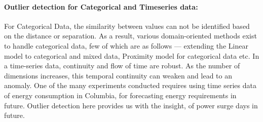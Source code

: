 \documentclass[runningheads]{llncs}
\begin{document}
\paragraph*{Outlier detection for Categorical and Timeseries data:} For Categorical Data, the similarity between values can not be identified based on the distance or separation. As a result, various domain-oriented methods exist to handle categorical data, few of which are as follows — extending the Linear model to categorical and mixed data, Proximity model for categorical data etc. In a time-series data, continuity and flow of time are robust. As the number of dimensions increases, this temporal continuity can weaken and lead to an anomaly. One of the many experiments conducted requires using time series data of energy consumption in Columbia, for forecasting energy requirements in future. Outlier detection here provides us with the insight, of power surge days in future.
\end{document}
